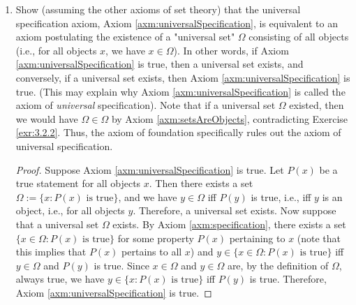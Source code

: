\documentclass[../main.tex]{subfiles}
\begin{document}
\begin{enumerate}[ref={\thesection.\arabic*}]
\begin{proof}
        Suppose for the sake of contradiction that for two sets $A,B$, $A\in B$ and $B\in A$. By Axioms \ref{axm:setsAreObjects} and \ref{axm:singletonPair}, there exists a set $\{A,B\}$ whose only elements are $A$ and $B$. Since $A\in B$ and $A\in\{A,B\}$, Definition \ref{dfn:intersection}, tells us that $A\in B\cap\{A,B\}$. Since there exists an object $x$ (namely $A$) such that $x\in B\cap\{A,B\}$, by Axiom \ref{axm:emptyset} and Definition \ref{dfn:setEquality}, $B\cap\{A,B\}\neq\emptyset$. By a similar argument, $A\cap\{A,B\}\neq\emptyset$. Thus, we have $A,B$ are sets, $B\cap\{A,B\}\neq\emptyset$, and $A\cap\{A,B\}\neq\emptyset$. But by Axiom \ref{axm:regularity}, an element $x$ of $\{A,B\}$ (namely $A$ or $B$) must either not be a set or satisfy $x\cap\{A,B\}=\emptyset$, a contradiction. Therefore, $A\notin B$ or $B\notin A$.
    \end{proof}
    \item \label{exr:3.2.3}Show (assuming the other axioms of set theory) that the universal specification axiom, Axiom \ref{axm:universalSpecification}, is equivalent to an axiom postulating the existence of a "universal set" $\Omega$ consisting of all objects (i.e., for all objects $x$, we have $x\in\Omega$). In other words, if Axiom \ref{axm:universalSpecification} is true, then a universal set exists, and conversely, if a universal set exists, then Axiom \ref{axm:universalSpecification} is true. (This may explain why Axiom \ref{axm:universalSpecification} is called the axiom of \emph{universal} specification). Note that if a universal set $\Omega$ existed, then we would have $\Omega\in\Omega$ by Axiom \ref{axm:setsAreObjects}, contradicting Exercise \ref{exr:3.2.2}. Thus, the axiom of foundation specifically rules out the axiom of universal specification.
    \begin{proof}
        Suppose Axiom \ref{axm:universalSpecification} is true. Let $P(x)$ be a true statement for all objects $x$. Then there exists a set $\Omega:=\{x:P(x)\text{ is true}\}$, and we have $y\in\Omega$ iff $P(y)$ is true, i.e., iff $y$ is an object, i.e., for all objects $y$. Therefore, a universal set exists. Now suppose that a universal set $\Omega$ exists. By Axiom \ref{axm:specification}, there exists a set $\{x\in\Omega:P(x)\text{ is true}\}$ for some property $P(x)$ pertaining to $x$ (note that this implies that $P(x)$ pertains to all $x$) and $y\in\{x\in\Omega:P(x)\text{ is true}\}$ iff $y\in\Omega$ and $P(y)$ is true. Since $x\in\Omega$ and $y\in\Omega$ are, by the definition of $\Omega$, always true, we have $y\in\{x:P(x)\text{ is true}\}$ iff $P(y)$ is true. Therefore, Axiom \ref{axm:universalSpecification} is true.
    \end{proof}
\end{enumerate}
\end{document}
